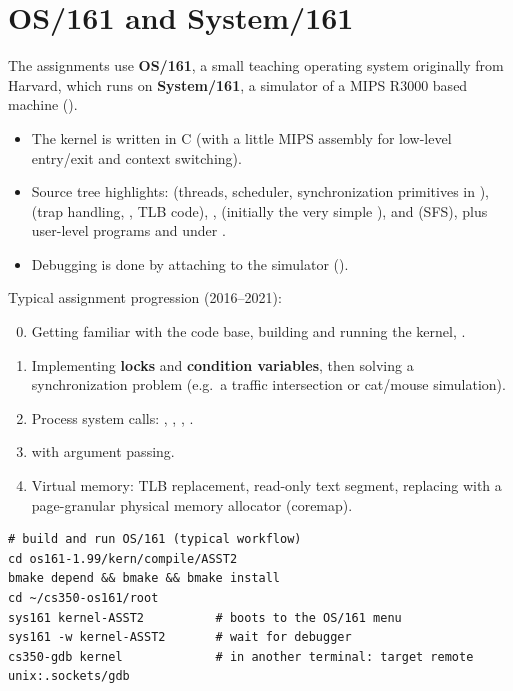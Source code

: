 \section{OS/161 and System/161}

The assignments use \textbf{OS/161}, a small teaching operating system originally from Harvard,
which runs on \textbf{System/161}, a simulator of a MIPS R3000 based machine ().

\begin{itemize}
  \item The kernel is written in C (with a little MIPS assembly for low-level entry/exit and
    context switching).
  \item Source tree highlights:  (threads, scheduler, synchronization
    primitives in ),  (trap handling, ,
    TLB code), ,  (initially the very simple ),
     and  (SFS), plus user-level programs and  under
    .
  \item Debugging is done by attaching  to the simulator ().
\end{itemize}

Typical assignment progression (2016--2021):
\begin{enumerate}[label=\textbf{A\arabic*}]
  \setcounter{enumi}{-1}
  \item Getting familiar with the code base, building and running the kernel, .
  \item Implementing \textbf{locks} and \textbf{condition variables}, then solving a
    synchronization problem (e.g.\ a traffic intersection or cat/mouse simulation).
  \item[\textbf{A2a}] Process system calls: , , , .
  \item[\textbf{A2b}]  with argument passing.
  \item[\textbf{A3}] Virtual memory: TLB replacement, read-only text segment, replacing
     with a page-granular physical memory allocator (coremap).
\end{enumerate}

\begin{lstlisting}[style=bash]
# build and run OS/161 (typical workflow)
cd os161-1.99/kern/compile/ASST2
bmake depend && bmake && bmake install
cd ~/cs350-os161/root
sys161 kernel-ASST2          # boots to the OS/161 menu
sys161 -w kernel-ASST2       # wait for debugger
cs350-gdb kernel             # in another terminal: target remote unix:.sockets/gdb
\end{lstlisting}

